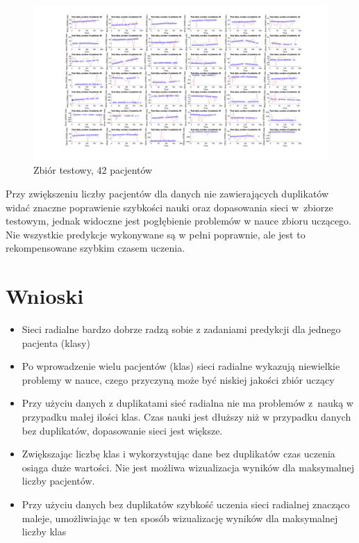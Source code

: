 \documentclass[12pt]{article}
\begin{document}
\begin{figure}[h!]

\centering
\includegraphics[width=1.1\textwidth]{test-cut-42.png}
\caption{Zbiór testowy, 42 pacjentów}

\end{figure}

Przy zwiększeniu liczby pacjentów dla danych nie zawierających duplikatów widać znaczne poprawienie szybkości nauki oraz dopasowania sieci w~zbiorze testowym, jednak widoczne jest pogłębienie problemów w nauce zbioru uczącego. Nie wszystkie predykcje wykonywane są w pełni poprawnie, ale jest to rekompensowane szybkim czasem uczenia.

\newpage
\section{Wnioski}

\begin{itemize}
\item Sieci radialne bardzo dobrze radzą sobie z zadaniami predykcji dla jednego pacjenta (klasy)
\item Po wprowadzenie wielu pacjentów (klas) sieci radialne wykazują niewielkie problemy w nauce, czego przyczyną może być niskiej jakości zbiór uczący
\item Przy użyciu danych z duplikatami sieć radialna nie ma problemów z~nauką w przypadku małej ilości klas. Czas nauki jest dłuższy niż w przypadku danych bez duplikatów, dopasowanie sieci jest większe.
\item Zwiększając liczbę klas i wykorzystując dane bez duplikatów czas uczenia osiąga duże wartości. Nie jest możliwa wizualizacja wyników dla maksymalnej liczby pacjentów.
\item Przy użyciu danych bez duplikatów szybkość uczenia sieci radialnej znacząco maleje, umożliwiając w ten sposób wizualizację wyników dla maksymalnej liczby klas
\end{itemize}
\end{document}
